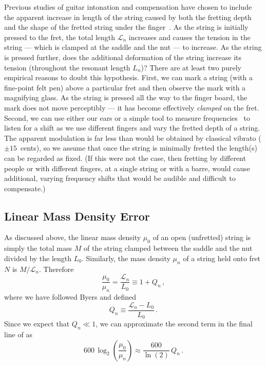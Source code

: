 Previous studies of guitar intonation and compensation have chosen to include the apparent increase in length of the string caused by both the fretting depth and the shape of the fretted string under the finger~\cite{ref:byers1996cgi,ref:varieschi2010icf}. As the string is initially pressed to the fret, the total length $\mathcal{L}_n$ increases and causes the tension in the string --- which is clamped at the saddle and the nut --- to increase. As the string is pressed further, does the additional deformation of the string increase its tension (throughout the resonant length $L_n$)? There are at least two purely empirical reasons to doubt this hypothesis. First, we can mark a string (with a fine-point felt pen) above a particular fret and then observe the mark with a magnifying glass. As the string is pressed all the way to the finger board, the mark does not move perceptibly --- it has become effectively \emph{clamped} on the fret. Second, we can use either our ears or a simple tool to measure frequencies~\cite{ref:pgtweb} to listen for a shift as we use different fingers and vary the fretted depth of a string. The apparent modulation is far less than would be obtained by classical vibrato ($\pm15$~cents), so we assume that once the string is minimally fretted the length(s) can be regarded as fixed. (If this were not the case, then fretting by different people or with different fingers, at a single string or with a barre, would cause additional, varying frequency shifts that would be audible and difficult to compensate.)

 \subsection{Linear Mass Density Error}
As discussed above, the linear mass density $\mu_0$ of an open (unfretted) string is simply the total mass $M$ of the string clamped between the saddle and the nut divided by the length $L_0$. Similarly, the mass density $\mu_n$ of a string held onto fret $N$ is $M/\mathcal{L}_n$. Therefore
 \begin{equation}
\frac{\mu_0}{\mu_n} = \frac{\mathcal{L}_n}{L_0} \equiv 1 + Q_n\, ,
 \end{equation}
where we have followed Byers and defined~\cite{ref:byers1996cgi,ref:varieschi2010icf}
 \begin{equation} \label{eqn:lambda_n_def}
Q_n \equiv \frac{\mathcal{L}_n - L_0}{L_0}\, .
 \end{equation}
Since we expect that $Q_n \ll 1$, we can approximate the second term in the final line of  as
 \begin{equation} \label{eqn:lmd_error}
600\, \log_2 \left(  \frac{\mu_0}{\mu_n} \right) \approx \frac{600}{\ln(2)}\, Q_n\, .
 \end{equation}

